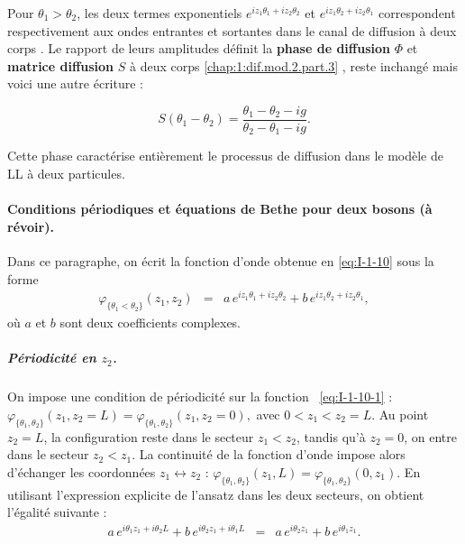Pour \(\theta_1 > \theta_2\), les deux termes exponentiels 
\(e^{i z_1 \theta_1 + i z_2 \theta_2}\) et \(e^{i z_1 \theta_2 + i z_2 \theta_1}\)
correspondent respectivement aux ondes entrantes et sortantes dans le canal de diffusion à deux corps \cite{Bouchoule_2022}.  
Le rapport de leurs amplitudes définit la {\bf phase de diffusion} $\Phi$ et  {\bf matrice diffusion} $S$  à deux corps \eqref{chap:1:dif.mod.2.part.3} , reste inchangé mais voici une autre écriture :

\begin{equation}\label{chap:1:dif.mod.2.part.4}
	S(\theta_1- \theta_2)  
	= \frac{\theta_1 - \theta_2 - ig}{\theta_2 - \theta_1 - ig}.
\end{equation}

Cette phase caractérise entièrement le processus de diffusion dans le modèle de \gls{LL} à deux particules.

\paragraph{Conditions périodiques et équations de Bethe pour deux bosons {\color{red}(à révoir)}.}

Dans ce paragraphe, on écrit la fonction d’onde obtenue en \eqref{eq:I-1-10} sous la forme
\begin{eqnarray}\label{eq:I-1-10-1}
	\varphi_{\{\theta_1 < \theta_2\}}(z_1 , z_2) 
	&=&  a\, e^{ i z_1 \theta_1 + i z_2 \theta_2 } 
	+ b\, e^{ i z_1 \theta_2 + i z_2 \theta_1}, 
\end{eqnarray}
où $a$ et $b$ sont deux coefficients complexes.

\subparagraph{Périodicité en \( z_2 \).}  
On impose une condition de périodicité sur la fonction ~\eqref{eq:I-1-10-1} :
\(
	\varphi_{\{\theta_1,\theta_2\}}(z_1, z_2 = L) = \varphi_{\{\theta_1,\theta_2\}}(z_1, z_2 = 0),
\)
avec \( 0 < z_1 < z_2 = L \).  
Au point \( z_2 = L \), la configuration reste dans le secteur \( z_1 < z_2 \), tandis qu’à \( z_2 = 0 \), on entre dans le secteur \( z_2 < z_1 \). La continuité de la fonction d’onde impose alors d’échanger les coordonnées \( z_1 \leftrightarrow z_2 \) :
\(
	\varphi_{\{\theta_1,\theta_2\}}(z_1, L) = \varphi_{\{\theta_1,\theta_2\}}(0, z_1).
\)
En utilisant l’expression explicite de l’ansatz dans les deux secteurs, on obtient l’égalité suivante :
\begin{eqnarray}\label{eq:I-1-10-2}
	a\,e^{i\theta_1 z_1 + i\theta_2 L} + b\,e^{i\theta_2 z_1 + i\theta_1 L}
	&=& a\,e^{i\theta_2 z_1} + b\,e^{i\theta_1 z_1}.
\end{eqnarray}

